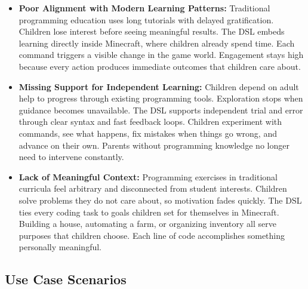 \begin{itemize}
    \item[\textbf{--}] \textbf{Poor Alignment with Modern Learning Patterns:} 
    Traditional programming education uses long tutorials with delayed gratification. 
    Children lose interest before seeing meaningful results. 
    The DSL embeds learning directly inside Minecraft, where children already spend time. 
    Each command triggers a visible change in the game world. 
    Engagement stays high because every action produces immediate outcomes that children care about.

    \item[\textbf{--}] \textbf{Missing Support for Independent Learning:} 
    Children depend on adult help to progress through existing programming tools. 
    Exploration stops when guidance becomes unavailable. 
    The DSL supports independent trial and error through clear syntax and fast feedback loops. 
    Children experiment with commands, see what happens, fix mistakes when things go wrong, and advance on their own. 
    Parents without programming knowledge no longer need to intervene constantly.

    \item[\textbf{--}] \textbf{Lack of Meaningful Context:} 
    Programming exercises in traditional curricula feel arbitrary and disconnected from student interests. 
    Children solve problems they do not care about, so motivation fades quickly. 
    The DSL ties every coding task to goals children set for themselves in Minecraft. 
    Building a house, automating a farm, or organizing inventory all serve purposes that children choose. 
    Each line of code accomplishes something personally meaningful.
\end{itemize}

\subsection{Use Case Scenarios}

